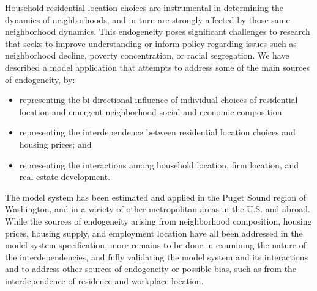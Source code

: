 \documentclass[12pt,a4paper]{article}
\begin{document}
Household residential location choices are instrumental in
determining the dynamics of neighborhoods, and in turn are strongly
affected by those same neighborhood dynamics.  This endogeneity
poses significant challenges to research that seeks to improve
understanding or inform policy regarding issues such as neighborhood
decline, poverty concentration, or racial segregation.  We have
described a model application that attempts to address some of the
main sources of endogeneity, by:

\begin{itemize}
\item representing the bi-directional influence of individual choices of
residential location and emergent neighborhood social and economic
composition;

\item representing the interdependence between residential location
choices and housing prices; and

\item representing the interactions among household location, firm
location, and real estate development.

\end{itemize}

The model system has been estimated and applied in the Puget Sound region 
of Washington, and in a variety of other metropolitan areas in the U.S. and
abroad.  While the sources of endogeneity arising from neighborhood 
composition, housing prices, housing supply, and employment location have
all been addressed in the model system specification, more remains to be
done in examining the nature of the interdependencies, and fully
validating the model system and its interactions and to address other
sources of endogeneity or possible bias, such as from the interdependence of
residence and workplace location.
\end{document}
